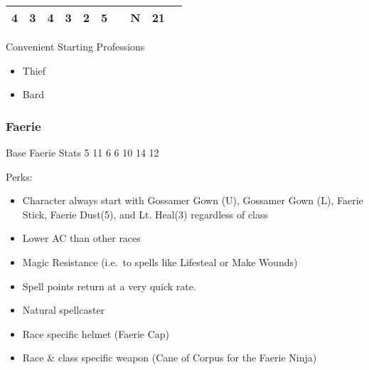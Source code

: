 \documentclass[12pt]{article}
\begin{document}
\begin{longtable}[]{@{}llllllllll@{}}
\begin{minipage}[t]{0.06\columnwidth}\raggedright\strut
4
\strut\end{minipage} &
\begin{minipage}[t]{0.06\columnwidth}\raggedright\strut
3
\strut\end{minipage} &
\begin{minipage}[t]{0.06\columnwidth}\raggedright\strut
4
\strut\end{minipage} &
\begin{minipage}[t]{0.06\columnwidth}\raggedright\strut
3
\strut\end{minipage} &
\begin{minipage}[t]{0.06\columnwidth}\raggedright\strut
2
\strut\end{minipage} &
\begin{minipage}[t]{0.06\columnwidth}\raggedright\strut
5
\strut\end{minipage} &
\begin{minipage}[t]{0.06\columnwidth}\raggedright\strut
\strut\end{minipage} &
\begin{minipage}[t]{0.07\columnwidth}\raggedright\strut
N
\strut\end{minipage} &
\begin{minipage}[t]{0.08\columnwidth}\raggedright\strut
21
\strut\end{minipage}\tabularnewline
\bottomrule
\end{longtable}

Convenient Starting Professions

\begin{itemize}
\item
  Thief
\item
  Bard
\end{itemize}

\subsubsection{Faerie}\label{faerie}

Base Faerie Stats 5 11 6 6 10 14 12

Perks:

\begin{itemize}
\item
  Character always start with Gossamer Gown (U), Gossamer Gown (L),
  Faerie Stick, Faerie Dust(5), and Lt. Heal(3) regardless of class
\item
  Lower AC than other races
\item
  Magic Resistance (i.e.~to spells like Lifesteal or Make Wounds)
\item
  Spell points return at a very quick rate.
\item
  Natural spellcaster
\item
  Race specific helmet (Faerie Cap)
\item
  Race \& class specific weapon (Cane of Corpus for the Faerie Ninja)
\end{itemize}
\end{document}
